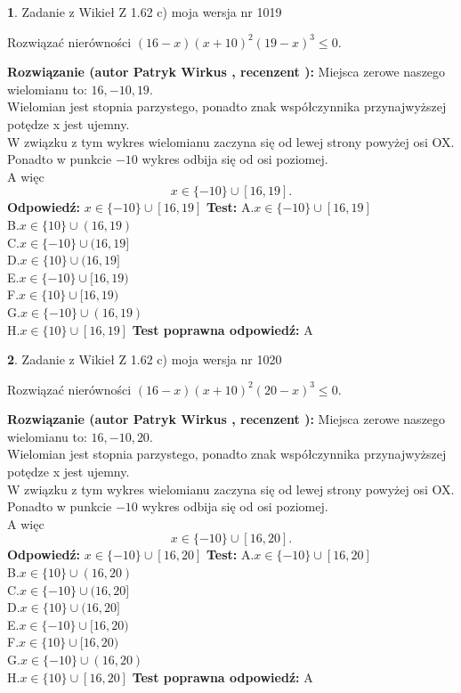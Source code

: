 \documentclass[12pt, a4paper]{article}
\theoremstyle{definition} %
\newtheorem{zad}{}
\newcommand{\zadStart}[1]{\begin{zad}#1\newline}
\newcommand{\zadStop}{\end{zad}}
\newcommand{\rozwStart}[2]{\noindent \textbf{Rozwiązanie (autor #1 , recenzent #2): }\newline}
\newcommand{\rozwStop}{\newline}
\newcommand{\odpStart}{\noindent \textbf{Odpowiedź:}\newline}
\newcommand{\odpStop}{\newline}
\newcommand{\testStart}{\noindent \textbf{Test:}\newline}
\newcommand{\testStop}{\newline}
\newcommand{\kluczStart}{\noindent \textbf{Test poprawna odpowiedź:}\newline}
\newcommand{\kluczStop}{\newline}
\begin{document}
\zadStart{Zadanie z Wikieł Z 1.62 c) moja wersja nr 1019}

Rozwiązać nierówności $(16-x)(x+10)^{2}(19-x)^{3}\le0$.
\zadStop
\rozwStart{Patryk Wirkus}{}
Miejsca zerowe naszego wielomianu to: $16, -10, 19$.\\
Wielomian jest stopnia parzystego, ponadto znak współczynnika przy\linebreak najwyższej potędze x jest ujemny.\\ W związku z tym wykres wielomianu zaczyna się od lewej strony powyżej osi OX.\\
Ponadto w punkcie $-10$ wykres odbija się od osi poziomej.\\
A więc $$x \in \{-10\} \cup [16,19].$$
\rozwStop
\odpStart
$x \in \{-10\} \cup [16,19]$
\odpStop
\testStart
A.$x \in \{-10\} \cup [16,19]$\\
B.$x \in \{10\} \cup (16,19)$\\
C.$x \in \{-10\} \cup (16,19]$\\
D.$x \in \{10\} \cup (16,19]$\\
E.$x \in \{-10\} \cup [16,19)$\\
F.$x \in \{10\} \cup [16,19)$\\
G.$x \in \{-10\} \cup (16,19)$\\
H.$x \in \{10\} \cup [16,19]$
\testStop
\kluczStart
A
\kluczStop



\zadStart{Zadanie z Wikieł Z 1.62 c) moja wersja nr 1020}

Rozwiązać nierówności $(16-x)(x+10)^{2}(20-x)^{3}\le0$.
\zadStop
\rozwStart{Patryk Wirkus}{}
Miejsca zerowe naszego wielomianu to: $16, -10, 20$.\\
Wielomian jest stopnia parzystego, ponadto znak współczynnika przy\linebreak najwyższej potędze x jest ujemny.\\ W związku z tym wykres wielomianu zaczyna się od lewej strony powyżej osi OX.\\
Ponadto w punkcie $-10$ wykres odbija się od osi poziomej.\\
A więc $$x \in \{-10\} \cup [16,20].$$
\rozwStop
\odpStart
$x \in \{-10\} \cup [16,20]$
\odpStop
\testStart
A.$x \in \{-10\} \cup [16,20]$\\
B.$x \in \{10\} \cup (16,20)$\\
C.$x \in \{-10\} \cup (16,20]$\\
D.$x \in \{10\} \cup (16,20]$\\
E.$x \in \{-10\} \cup [16,20)$\\
F.$x \in \{10\} \cup [16,20)$\\
G.$x \in \{-10\} \cup (16,20)$\\
H.$x \in \{10\} \cup [16,20]$
\testStop
\kluczStart
A
\kluczStop
\end{document}
